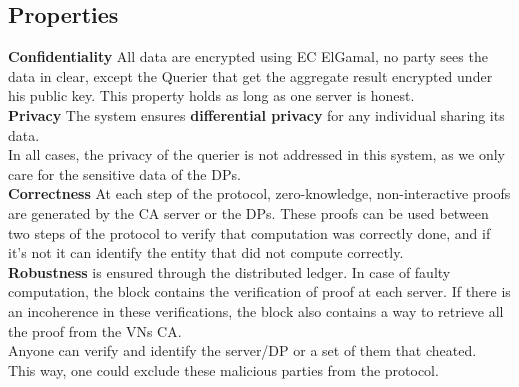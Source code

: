 \documentclass{article}
\begin{document}
\subsection{Properties}
\textbf{Confidentiality} All data are encrypted using EC ElGamal, no party sees the data in clear, except the Querier that get the aggregate result encrypted under his public key. This property holds as long as one server is honest.\\
\textbf{Privacy} The system ensures \textbf{differential privacy} for any individual sharing its data.\\
In all cases, the privacy of the querier is not addressed in this system, as we only care for the sensitive data of the DPs.\\
\textbf{Correctness} At each step of the protocol, zero-knowledge, non-interactive proofs are generated by the CA server or the DPs. These proofs can be used between two steps of the protocol to verify that computation was correctly done, and if it's not it can identify the entity that did not compute correctly.\\
\textbf{Robustness} is ensured through the distributed ledger. In case of faulty computation, the block contains the verification of proof at each server.
If there is an incoherence in these verifications, the block also contains a way to retrieve all the proof from the VNs CA.\\
Anyone can verify and identify the server/DP or a set of them that cheated.\\
This way, one could exclude these malicious parties from the protocol.
\end{document}
